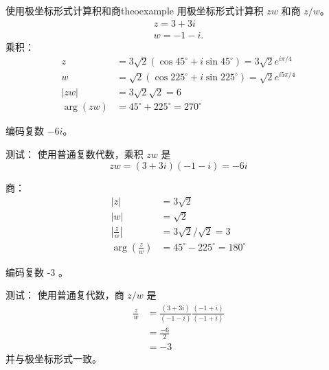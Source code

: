 \begin{myexample}{使用极坐标形式计算积和商}{theoexample}
用极坐标形式计算积 $z w$ 和商 $z / w$。
$$
    \begin{gathered}
        z=3+3 i \\
        w=-1-i .
    \end{gathered}
$$
乘积：
$$
    \begin{aligned}
        z          & =3 \sqrt{2}\left(\cos 45^{\circ}+i \sin 45^{\circ}\right)=3 \sqrt{2} e^{i \pi / 4} \\
        w          & =\sqrt{2}\left(\cos 225^{\circ}+i \sin 225^{\circ}\right)=\sqrt{2} e^{i 5 \pi / 4} \\
        |z w|      & =3 \sqrt{2} \sqrt{2}=6                                                             \\
        \arg (z w) & =45^{\circ}+225^{\circ}=270^{\circ}
    \end{aligned}
$$

编码复数 $-6 i$。

测试： 使用普通复数代数，乘积 $z w$ 是
$$
    z w=(3+3 i)(-1-i)=-6 i
$$

商：
$$
    \begin{aligned}
        |z|                           & =3 \sqrt{2}                         \\
        |w|                           & =\sqrt{2}                           \\
        \left|\frac{z}{w}\right|      & =3 \sqrt{2} / \sqrt{2}=3            \\
        \arg \left(\frac{z}{w}\right) & =45^{\circ}-225^{\circ}=180^{\circ}
    \end{aligned}
$$

编码复数 -3 。

测试： 使用普通复代数，商 $z / w$ 是
$$
    \begin{aligned}
        \frac{z}{w} & =\frac{(3+3 i)}{(-1-i)} \frac{(-1+i)}{(-1+i)} \\
                    & =\frac{-6}{2}                                 \\
                    & =-3
    \end{aligned}
$$
并与极坐标形式一致。
\end{myexample}


